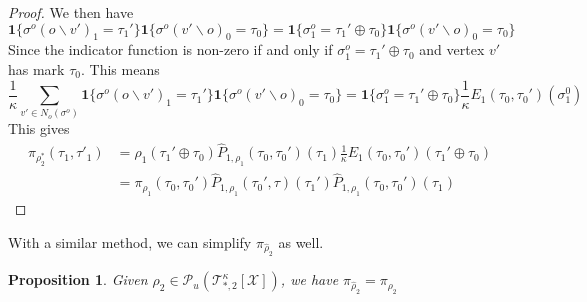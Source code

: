 \documentclass[12pt]{article}
\newtheorem{proposition}[theorem]{Proposition}
\newcommand{\X}{{\mathcal{X}}}
\newcommand{\TT}{{\mathcal{T}}}
\newcommand{\one}[1]{\mathbf{1}\{#1\}}
\newcommand{\tree}[2]{\TT_{*, #1}^{#2}[\X]}
\numberwithin{equation}{section}
\begin{document}
\begin{proof}
    We then have
    \begin{equation*}
        \one{\sigma^o(o\backslash v')_1 = \tau_1'}\one{\sigma^o(v'\backslash o)_0 = \tau_0} = \one{\sigma^o_1 = \tau_1' \oplus \tau_0}\one{\sigma^o(v'\backslash o)_0 = \tau_0}
    \end{equation*}
    Since the indicator function is non-zero if and only if $\sigma^o_1 = \tau_1' \oplus \tau_0$ and vertex $v'$ has mark $\tau_0$.
    This means
    \begin{equation*}
        \frac1\kappa \sum_{v'\in N_o(\sigma^o)}\one{\sigma^o(o\backslash v')_1 = \tau_1'}\one{\sigma^o(v'\backslash o)_0 = \tau_0} = \one{\sigma^o_1 = \tau_1' \oplus \tau_0}\frac1\kappa E_1(\tau_0, \tau_0')(\sigma^0_1)
    \end{equation*}
    This gives
    \begin{align*}
        \pi_{\rho_2^*}(\tau_1, \tau'_1) & = \rho_1(\tau_1' \oplus \tau_0)\widehat{P}_{1, \rho_1}(\tau_0, \tau_0')(\tau_1)\frac1\kappa E_1(\tau_0, \tau_0')(\tau_1' \oplus \tau_0) \\
                                        & = \pi_{\rho_1}(\tau_0, \tau_0')\widehat{P}_{1, \rho_1}(\tau_0', \tau)(\tau_1')\widehat{P}_{1, \rho_1}(\tau_0, \tau_0')(\tau_1)
    \end{align*}

\end{proof}

With a similar method, we can simplify $\pi_{\widehat{\rho}_2}$ as well.
\begin{proposition}
    Given $\rho_2\in\mathcal{P}_u(\tree{2}{\kappa})$, we have $\pi_{\widehat{\rho}_2} = \pi_{\rho_2}$
\end{proposition}
\end{document}
